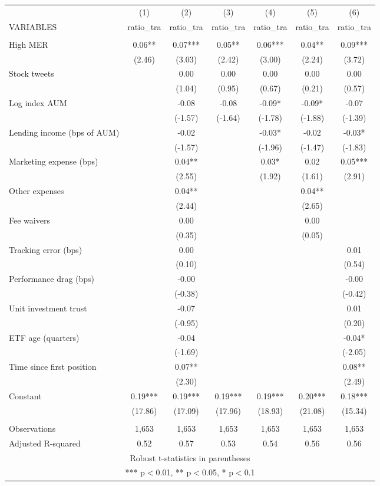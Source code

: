 \documentclass[]{article}
\begin{document}
\begin{tabular}{lcccccc} \hline
 & (1) & (2) & (3) & (4) & (5) & (6) \\
VARIABLES & ratio\_tra & ratio\_tra & ratio\_tra & ratio\_tra & ratio\_tra & ratio\_tra \\ \hline
 &  &  &  &  &  &  \\
High MER & 0.06** & 0.07*** & 0.05** & 0.06*** & 0.04** & 0.09*** \\
 & (2.46) & (3.03) & (2.42) & (3.00) & (2.24) & (3.72) \\
Stock tweets &  & 0.00 & 0.00 & 0.00 & 0.00 & 0.00 \\
 &  & (1.04) & (0.95) & (0.67) & (0.21) & (0.57) \\
Log index AUM &  & -0.08 & -0.08 & -0.09* & -0.09* & -0.07 \\
 &  & (-1.57) & (-1.64) & (-1.78) & (-1.88) & (-1.39) \\
Lending income (bps of AUM) &  & -0.02 &  & -0.03* & -0.02 & -0.03* \\
 &  & (-1.57) &  & (-1.96) & (-1.47) & (-1.83) \\
Marketing expense (bps) &  & 0.04** &  & 0.03* & 0.02 & 0.05*** \\
 &  & (2.55) &  & (1.92) & (1.61) & (2.91) \\
Other expenses &  & 0.04** &  &  & 0.04** &  \\
 &  & (2.44) &  &  & (2.65) &  \\
Fee waivers &  & 0.00 &  &  & 0.00 &  \\
 &  & (0.35) &  &  & (0.05) &  \\
Tracking error (bps) &  & 0.00 &  &  &  & 0.01 \\
 &  & (0.10) &  &  &  & (0.54) \\
Performance drag (bps) &  & -0.00 &  &  &  & -0.00 \\
 &  & (-0.38) &  &  &  & (-0.42) \\
Unit investment trust &  & -0.07 &  &  &  & 0.01 \\
 &  & (-0.95) &  &  &  & (0.20) \\
ETF age (quarters) &  & -0.04 &  &  &  & -0.04* \\
 &  & (-1.69) &  &  &  & (-2.05) \\
Time since first position &  & 0.07** &  &  &  & 0.08** \\
 &  & (2.30) &  &  &  & (2.49) \\
Constant & 0.19*** & 0.19*** & 0.19*** & 0.19*** & 0.20*** & 0.18*** \\
 & (17.86) & (17.09) & (17.96) & (18.93) & (21.08) & (15.34) \\
 &  &  &  &  &  &  \\
Observations & 1,653 & 1,653 & 1,653 & 1,653 & 1,653 & 1,653 \\
 Adjusted R-squared & 0.52 & 0.57 & 0.53 & 0.54 & 0.56 & 0.56 \\ \hline
\multicolumn{7}{c}{ Robust t-statistics in parentheses} \\
\multicolumn{7}{c}{ *** p$<$0.01, ** p$<$0.05, * p$<$0.1} \\
\end{tabular}
\end{document}
